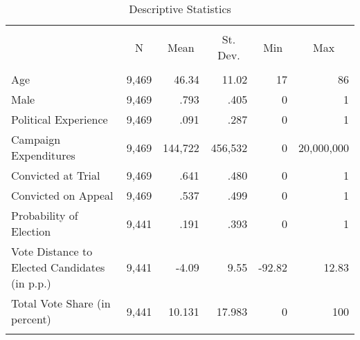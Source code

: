 
\begin{table}[!htbp] \centering
  \caption{Descriptive Statistics}
  \label{tab:sumstats}
\scriptsize
\begin{tabular}{@{\extracolsep{2pt}}lrrrrr}
\\[-1.8ex]\hline
\hline \\[-1.8ex]
& \multicolumn{1}{c}{N} & \multicolumn{1}{c}{Mean} & \multicolumn{1}{c}{St. Dev.} & \multicolumn{1}{c}{Min} & \multicolumn{1}{c}{Max} \\
\hline \\[-1.8ex]
Age                                           & 9,469 & 46.34 & 11.02 & 17 & 86 \\
Male                                          & 9,469 & .793 & .405 & 0 & 1 \\
Political Experience                          & 9,469 & .091 & .287 & 0 & 1 \\
Campaign Expenditures                         & 9,469 & 144,722 & 456,532 & 0 & 20,000,000 \\
Convicted at Trial                            & 9,469 & .641 & .480 & 0 & 1 \\
Convicted on Appeal                           & 9,469 & .537 & .499 & 0 & 1 \\
Probability of Election                       & 9,441 & .191 & .393 & 0 & 1 \\
Vote Distance to Elected Candidates (in p.p.) & 9,441 & -4.09 & 9.55 & -92.82 & 12.83 \\
Total Vote Share (in percent)                 & 9,441 & 10.131 & 17.983 & 0 & 100 \\
\hline
\hline \\[-1.8ex]
\end{tabular}
\end{table}
